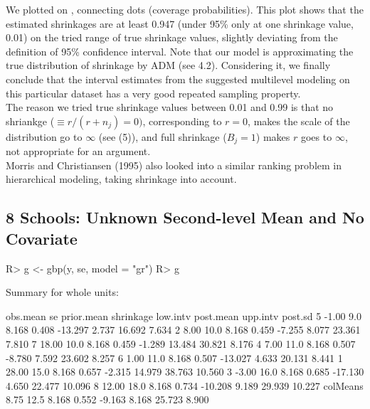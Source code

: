 \documentclass[article]{jss}
\begin{document}
We plotted  on , connecting dots (coverage probabilities). This plot shows that the estimated shrinkages are at least 0.947 (under 95\% only at one shrinkage value, 0.01) on the tried range of true shrinkage values, slightly deviating from the definition of 95\% confidence interval. Note that our model is approximating the true distribution of shrinkage by ADM (see 4.2). Considering it, we finally conclude that the interval estimates from the suggested multilevel modeling on this particular dataset has a very good repeated sampling property.
\\

The reason we tried true shrinkage values between 0.01 and 0.99 is that no shriankge ($\equiv r / (r + n_{j})=0)$, corresponding to $r=0$, makes the scale of the distribution go to $\infty$ (see (5)), and full shrinkage ($B_{j}=1$) makes $r$ goes to $\infty$, not appropriate for an argument.
\\

Morris and Christiansen (1995) also looked into a similar ranking problem in hierarchical modeling, taking shrinkage into account.
\\

\subsection[Unknown Second-level Mean and No Covariate]{8 Schools: Unknown Second-level Mean and No Covariate}
\begin{CodeChunk}
\begin{CodeInput}
R> g <- gbp(y, se, model = "gr")
R> g
\end{CodeInput}
\begin{CodeOutput}
Summary for whole units: 

         obs.mean   se prior.mean shrinkage low.intv post.mean upp.intv post.sd
5           -1.00  9.0      8.168     0.408  -13.297     2.737   16.692   7.634
2            8.00 10.0      8.168     0.459   -7.255     8.077   23.361   7.810
7           18.00 10.0      8.168     0.459   -1.289    13.484   30.821   8.176
4            7.00 11.0      8.168     0.507   -8.780     7.592   23.602   8.257
6            1.00 11.0      8.168     0.507  -13.027     4.633   20.131   8.441
1           28.00 15.0      8.168     0.657   -2.315    14.979   38.763  10.560
3           -3.00 16.0      8.168     0.685  -17.130     4.650   22.477  10.096
8           12.00 18.0      8.168     0.734  -10.208     9.189   29.939  10.227
colMeans     8.75 12.5      8.168     0.552   -9.163     8.168   25.723   8.900
\end{CodeOutput}
\end{CodeChunk}
\end{document}
